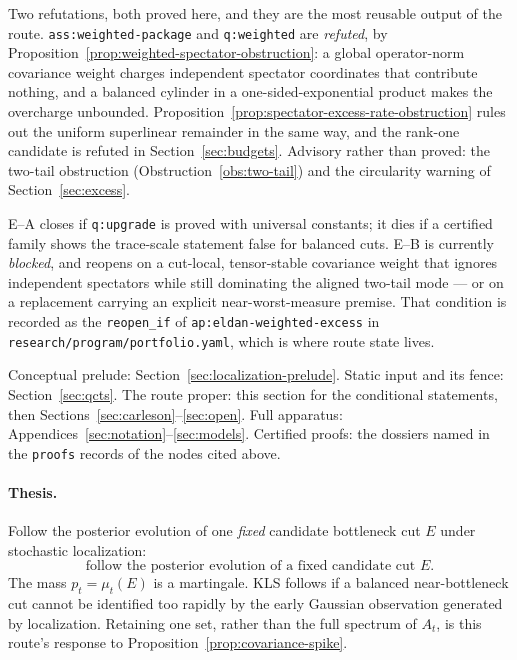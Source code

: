 \documentclass[../../main.tex]{subfiles}
\begin{document}
\begin{description}[leftmargin=0pt,style=nextline,itemsep=0.3em]
  \item[6. Failed variants and obstructions.] Two refutations, both proved here, and they are
  the most reusable output of the route. \texttt{ass:weighted-package} and \texttt{q:weighted}
  are \emph{refuted}, by Proposition~\ref{prop:weighted-spectator-obstruction}: a global
  operator-norm covariance weight charges independent spectator coordinates that contribute
  nothing, and a balanced cylinder in a one-sided-exponential product makes the overcharge
  unbounded. Proposition~\ref{prop:spectator-excess-rate-obstruction} rules out the uniform
  superlinear remainder in the same way, and the rank-one candidate is refuted in
  Section~\ref{sec:budgets}. Advisory rather than proved: the two-tail obstruction
  (Obstruction~\ref{obs:two-tail}) and the circularity warning of Section~\ref{sec:excess}.

  \item[7. Completion or reopening criterion.] E--A closes if \texttt{q:upgrade} is proved with
  universal constants; it dies if a certified family shows the trace-scale statement false for
  balanced cuts. E--B is currently \emph{blocked}, and reopens on a cut-local, tensor-stable
  covariance weight that ignores independent spectators while still dominating the aligned
  two-tail mode --- or on a replacement carrying an explicit near-worst-measure premise. That
  condition is recorded as the \texttt{reopen\_if} of \texttt{ap:eldan-weighted-excess} in
  \texttt{research/program/portfolio.yaml}, which is where route state lives.

  \item[8. Technical reading guide.] Conceptual prelude:
  Section~\ref{sec:localization-prelude}. Static input and its fence: Section~\ref{sec:qcts}.
  The route proper: this section for the conditional statements, then
  Sections~\ref{sec:carleson}--\ref{sec:open}. Full apparatus:
  Appendices~\ref{sec:notation}--\ref{sec:models}. Certified proofs: the dossiers named in the
  \texttt{proofs} records of the nodes cited above.
\end{description}

\paragraph{Thesis.}
Follow the posterior evolution of one \emph{fixed} candidate bottleneck cut $E$ under stochastic
localization:
\[
  \boxed{\text{follow the posterior evolution of a fixed candidate cut }E.}
\]
The mass $p_t=\mu_t(E)$ is a martingale. KLS follows if a balanced near-bottleneck cut cannot be
identified too rapidly by the early Gaussian observation generated by localization. Retaining one
set, rather than the full spectrum of $A_t$, is this route's response to
Proposition~\ref{prop:covariance-spike}.
\end{document}
